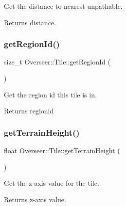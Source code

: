 Get the distance to nearest unpathable. 

\begin{DoxyReturn}{Returns}
distance. 
\end{DoxyReturn}
\mbox{\label{classOverseer_1_1Tile_aa1fa9037029a36f50b3c13130813e825}} 
\subsubsection{\texorpdfstring{get\+Region\+Id()}{getRegionId()}}
{\footnotesize\ttfamily size\+\_\+t Overseer\+::\+Tile\+::get\+Region\+Id (\begin{DoxyParamCaption}{ }\end{DoxyParamCaption})}



Get the region id this tile is in. 

\begin{DoxyReturn}{Returns}
regionid 
\end{DoxyReturn}
\mbox{\label{classOverseer_1_1Tile_a22171679810a298d4119b997004d3e13}} 
\subsubsection{\texorpdfstring{get\+Terrain\+Height()}{getTerrainHeight()}}
{\footnotesize\ttfamily float Overseer\+::\+Tile\+::get\+Terrain\+Height (\begin{DoxyParamCaption}{ }\end{DoxyParamCaption})}



Get the z-\/axis value for the tile. 

\begin{DoxyReturn}{Returns}
z-\/axis value. 
\end{DoxyReturn}
\mbox{\label{classOverseer_1_1Tile_aeddd0f013514a193e8da23bdeafdd6b9}} 
